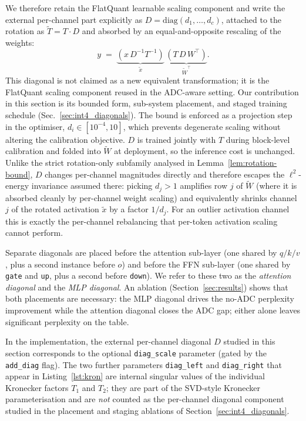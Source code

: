 \documentclass[a4paper,11pt,oneside]{article}
\theoremstyle{breakstyle}
\begin{document}
  We therefore retain the FlatQuant learnable scaling component
  and write the external per-channel part explicitly as
  $D = \mathrm{diag}(d_1, \ldots, d_c)$,
  attached to the rotation as $\tilde{T} = T \cdot D$ and absorbed
  by an equal-and-opposite rescaling of the weights:
  \[
    y \;=\;
      \underbrace{(x\,D^{-1}T^{-1})}_{\tilde{x}}\,
      \underbrace{(T\,D\,W^\top)}_{\tilde{W}^\top}.
  \]
  This diagonal is not claimed as a new equivalent transformation;
  it is the FlatQuant scaling component reused in the ADC-aware
  setting.  Our contribution in this section is its bounded
  form, sub-system placement, and staged training schedule
  (Sec.~\ref{sec:int4_diagonals}).  The bound is enforced as a
  projection step in the optimiser, $d_i \in [10^{-4}, 10]$, which
  prevents degenerate scaling without altering the calibration
  objective.  $D$ is trained jointly with $T$ during block-level
  calibration and folded into $\tilde{W}$ at deployment, so the
  inference cost is unchanged.  Unlike the strict rotation-only
  subfamily analysed in Lemma~\ref{lem:rotation-bound}, $D$
  changes per-channel magnitudes directly and therefore escapes the
  $\ell^2$-energy invariance assumed there: picking $d_j > 1$
  amplifies row $j$ of $\tilde{W}$ (where it is absorbed cleanly by
  per-channel weight scaling) and equivalently shrinks channel $j$
  of the rotated activation $\tilde{x}$ by a factor $1/d_j$.  For
  an outlier activation channel this is exactly the per-channel
  rebalancing that per-token activation scaling cannot perform.

  Separate diagonals are placed before the attention sub-layer
  (one shared by $q/k/v$, plus a second instance before $o$) and
  before the FFN sub-layer (one shared by \texttt{gate} and
  \texttt{up}, plus a second before \texttt{down}).  We refer to
  these two as the \emph{attention diagonal} and the \emph{MLP
  diagonal}.  An ablation (Section~\ref{sec:results}) shows that
  both placements are necessary: the MLP diagonal drives the no-ADC
  perplexity improvement while the attention diagonal closes the
  ADC gap; either alone leaves significant perplexity on the table.

  In the implementation, the external per-channel diagonal $D$
  studied in this section corresponds to the optional
  \texttt{diag\_scale} parameter (gated by the \texttt{add\_diag}
  flag).  The two further parameters \texttt{diag\_left} and
  \texttt{diag\_right} that appear in
  Listing~\ref{lst:kron} are internal singular values of the
  individual Kronecker factors $T_1$ and $T_2$; they are part of the
  SVD-style Kronecker parameterisation and are \emph{not} counted as
  the per-channel diagonal component studied in the placement and
  staging ablations of Section~\ref{sec:int4_diagonals}.
\end{document}
